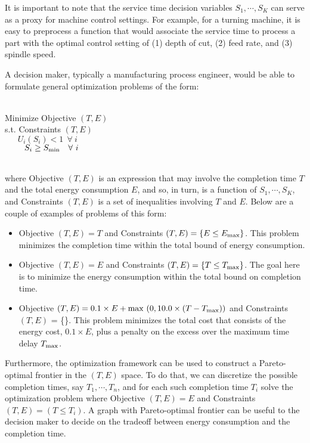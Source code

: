 \documentclass[a4paper, 12pt]{article} %
\begin{document}
It is important to note that the service time decision variables $S_1, \cdots, S_K$  can serve as a proxy for machine control settings. For example, for a turning machine, it is easy to preprocess a function that would associate the service time to process a part with the optimal control setting of (1) depth of cut, (2) feed rate, and (3) spindle  speed. 

A decision maker,  typically  a manufacturing process engineer, would be able to formulate general optimization problems of the form:

\makebox{}\\
Minimize Objective $(T,E)$\\
s.t.   Constraints $(T,E)$\\
$~~~~~~~U_i (S_i) < 1 ~~\forall ~i$ \\
$~~~~~~~S_i \geq S_{\rm min} ~~~\forall ~i$

\makebox{}\\
where Objective $(T,E)$ is an expression that may involve the completion time $T$ and the total energy consumption $E$, and so, in turn, is a function of $S_1, \cdots, S_K$, and Constraints $(T, E)$ is a set of  inequalities involving $T$ and $E$. Below are a couple of examples of problems of this form:
\begin{itemize}
\item Objective $(T,E) = T$ and Constraints $(T,E) = \{E \leq E_{\rm max}\}$. This problem  minimizes the completion time within the total bound of energy consumption.

\item  Objective $(T,E) = E$ and Constraints $(T,E) = \{T \leq T_{\rm max}\}$. The goal here is to minimize the energy consumption within the total bound on completion time.

\item Objective $(T,E)  = 0.1  \times E +  {\rm  max} ~(0, 10.0 \times (T - T_{\rm max})) $   and Constraints $(T,E)$ = \{\}. This problem minimizes the total cost that consists of the energy cost, $0.1 \times E$,   plus a penalty on the excess over the maximum time delay  $T_{\rm max}$.
\end{itemize}

Furthermore, the optimization framework can be used to construct a Pareto-optimal frontier in the $(T,E)$ space. To do that, we can discretize the possible completion times, say $T_1, \cdots,T_n$, and for each such completion time $T_i$ solve the optimization problem where Objective $(T,E) = E$ and Constraints $(T,E) = (T \leq T_i)$. A graph with Pareto-optimal frontier can be useful to the decision maker to decide on the tradeoff between energy consumption and the completion time.
\end{document}
